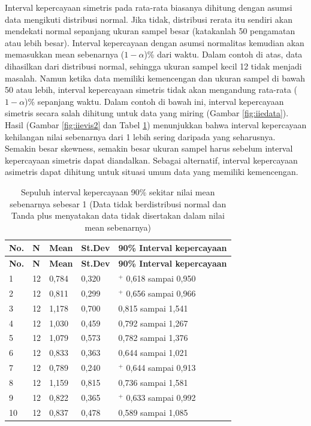 \documentclass[]{book}
\begin{document}
Interval kepercayaan simetris pada rata-rata biasanya dihitung dengan
asumsi data mengikuti distribusi normal. Jika tidak, distribusi rerata
itu sendiri akan mendekati normal sepanjang ukuran sampel besar
(katakanlah 50 pengamatan atau lebih besar). Interval kepercayaan dengan
asumsi normalitas kemudian akan memasukkan mean sebenarnya
(\(1-\alpha\))\% dari waktu. Dalam contoh di atas, data dihasilkan dari
distribusi normal, sehingga ukuran sampel kecil 12 tidak menjadi
masalah. Namun ketika data memiliki kemencengan dan ukuran sampel di
bawah 50 atau lebih, interval kepercayaan simetris tidak akan mengandung
rata-rata (\(1-\alpha\))\% sepanjang waktu. Dalam contoh di bawah ini,
interval kepercayaan simetris secara salah dihitung untuk data yang
miring (Gambar \ref{fig:iiedata}). Hasil (Gambar \ref{fig:iievis2} dan
Tabel \ref{tab:iie2}) menunjukkan bahwa interval kepercayaan kehilangan
nilai sebenarnya dari 1 lebih sering daripada yang seharusnya. Semakin
besar skewness, semakin besar ukuran sampel harus sebelum interval
kepercayaan simetris dapat diandalkan. Sebagai alternatif, interval
kepercayaan asimetris dapat dihitung untuk situasi umum data yang
memiliki kemencengan.

\begin{longtable}[]{@{}lllll@{}}
\caption{\label{tab:iie2} Sepuluh interval kepercayaan 90\% sekitar nilai
mean sebenarnya sebesar 1 (Data tidak berdistribusi normal dan Tanda
plus menyatakan data tidak disertakan dalam nilai mean
sebenarnya)}\tabularnewline
\toprule
\textbf{No.} & \textbf{N} & \textbf{Mean} & \textbf{St.Dev} &
\textbf{90\% Interval kepercayaan}\tabularnewline
\midrule
\endfirsthead
\toprule
\textbf{No.} & \textbf{N} & \textbf{Mean} & \textbf{St.Dev} &
\textbf{90\% Interval kepercayaan}\tabularnewline
\midrule
\endhead
1 & 12 & 0,784 & 0,320 & \(^+\) 0,618 sampai 0,950\tabularnewline
2 & 12 & 0,811 & 0,299 & \(^+\) 0,656 sampai 0,966\tabularnewline
3 & 12 & 1,178 & 0,700 & 0,815 sampai 1,541\tabularnewline
4 & 12 & 1,030 & 0,459 & 0,792 sampai 1,267\tabularnewline
5 & 12 & 1,079 & 0,573 & 0,782 sampai 1,376\tabularnewline
6 & 12 & 0,833 & 0,363 & 0,644 sampai 1,021\tabularnewline
7 & 12 & 0,789 & 0,240 & \(^+\) 0,644 sampai 0,913\tabularnewline
8 & 12 & 1,159 & 0,815 & 0,736 sampai 1,581\tabularnewline
9 & 12 & 0,822 & 0,365 & \(^+\) 0,633 sampai 0,992\tabularnewline
10 & 12 & 0,837 & 0,478 & 0,589 sampai 1,085\tabularnewline
\bottomrule
\end{longtable}
\end{document}
